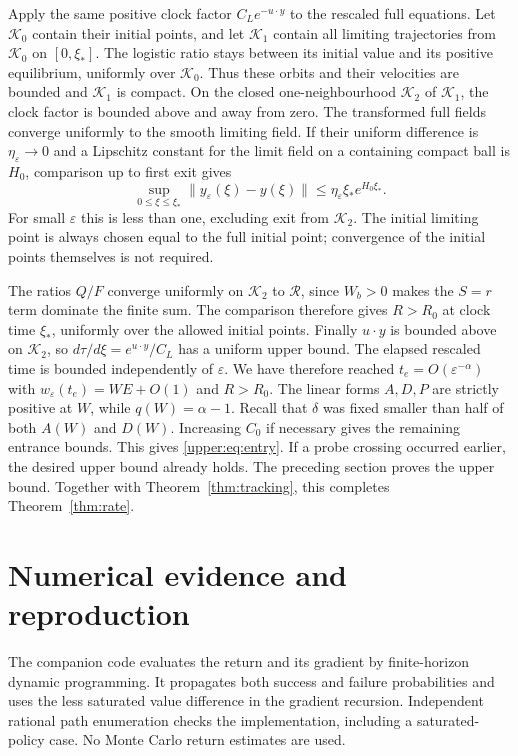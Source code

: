 \documentclass[11pt]{article}
\newcommand{\eps}{\varepsilon}\newcommand{\R}{\mathbb R}
\begin{document}
Apply the same positive clock factor $C_Le^{-u\cdot y}$ to the rescaled
full equations. Let $\mathcal K_0$ contain their initial points, and let
$\mathcal K_1$ contain all limiting trajectories from $\mathcal K_0$ on
$[0,\xi_*]$. The logistic ratio stays between its initial value and its
positive equilibrium, uniformly over $\mathcal K_0$. Thus these orbits
and their velocities are bounded and $\mathcal K_1$ is compact.
On the closed one-neighbourhood $\mathcal K_2$ of $\mathcal K_1$, the
clock factor is bounded above and away from zero. The transformed full
fields converge uniformly to the smooth limiting field. If their uniform
difference is $\eta_\eps\to0$ and a Lipschitz constant for the limit field
on a containing compact ball is $H_0$, comparison up to first exit gives
\[
 \sup_{0\le \xi\le \xi_*}\|y_\eps(\xi)-y(\xi)\|
 \le\eta_\eps \xi_* e^{H_0 \xi_*}.
\]
For small $\eps$ this is less than one, excluding exit from $\mathcal K_2$.
The initial limiting point is always chosen equal to the full initial
point; convergence of the initial points themselves is not required.

The ratios $Q/F$ converge uniformly on $\mathcal K_2$ to $\mathcal R$,
since $W_b>0$ makes the $S=r$ term dominate the finite sum. The comparison
therefore gives $R>R_0$ at clock time $\xi_*$, uniformly over the allowed
initial points. Finally $u\cdot y$ is bounded above on $\mathcal K_2$,
so $d\tau/d\xi=e^{u\cdot y}/C_L$ has a uniform upper bound. The elapsed
rescaled time is bounded independently of $\eps$. We have therefore reached
$t_e=O(\eps^{-\alpha})$ with $w_\eps(t_e)=WE+O(1)$ and $R>R_0$.
The linear forms $A,D,P$ are strictly positive at $W$, while
$q(W)=\alpha-1$. Recall that $\delta$ was fixed smaller than half of both $A(W)$ and $D(W)$.
Increasing $C_0$ if necessary gives the remaining entrance bounds. This gives
\eqref{upper:eq:entry}. If a probe crossing occurred earlier, the desired upper
bound already holds. The preceding section proves the upper bound. Together with
Theorem~\ref{thm:tracking}, this completes Theorem~\ref{thm:rate}.


\section{Numerical evidence and reproduction}
The companion code evaluates the return and its gradient by finite-horizon
dynamic programming. It propagates both success and failure probabilities
and uses the less saturated value difference in the gradient recursion.
Independent rational path enumeration checks the implementation, including
a saturated-policy case. No Monte Carlo return estimates are used.
\end{document}
